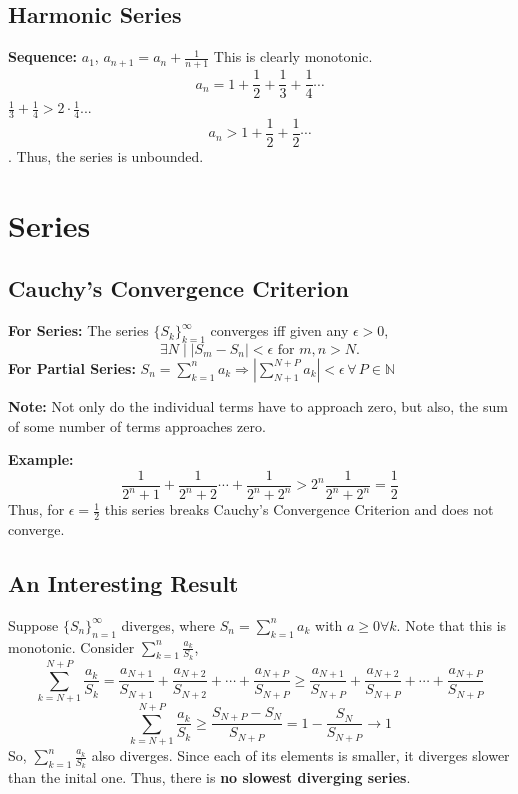 \documentclass[../main.tex]{subfiles}
\begin{document}
    \subsection{Harmonic Series}
        \textbf{Sequence: } $a_{1}$, $a_{n+1}=a_{n}+\frac{1}{n+1}$
        This is clearly monotonic.
        $$a_{n}=1+\frac{1}{2}+\frac{1}{3}+\frac{1}{4}\cdots$$
        $\frac{1}{3}+\frac{1}{4} > 2\cdot \frac{1}{4}$...
        $$a_{n}>1+\frac{1}{2}+\frac{1}{2}\cdots$$.
        Thus, the series is unbounded.

\section{Series}
    \subsection{Cauchy's Convergence Criterion}
        \textbf{For Series: } The series $\{S_{k}\}_{k=1}^{\infty}$ converges iff given any $\epsilon>0$,
        $$\exists N \mid |S_{m}-S_{n}|<\epsilon \text{ for } m, n > N\text{.}$$
        \noindent\textbf{For Partial Series: } $S_{n}=\sum_{k=1}^{n}a_{k}\Rightarrow|\sum_{N+1}^{N+P}a_{k}|<\epsilon \,\forall\, P \in \mathbb{N}$

        \noindent\textbf{Note: } Not only do the individual terms have to approach zero, but also, the sum of some number of terms approaches zero.
        
        \textbf{Example: }
            $$\frac{1}{2^{n}+1}+\frac{1}{2^{n}+2}\cdots+\frac{1}{2^{n}+2^{n}} > 2^{n}\frac{1}{2^{n}+2^{n}}=\frac{1}{2}$$
            Thus, for $\epsilon = \frac{1}{2}$ this series breaks Cauchy's Convergence Criterion and does not converge.

    \subsection{An Interesting Result}
        Suppose $\{S_{n}\}_{n=1}^{\infty}$ diverges, where $S_{n}=\sum_{k=1}^{n}a_{k}$ with $ a\geq 0 \forall k$. Note that this is monotonic.
        Consider $\sum^{n}_{k=1}\frac{a_{k}}{S_{k}}$,
            $$\sum_{k=N+1}^{N+P}\frac{a_{k}}{S_{k}}=\frac{a_{N+1}}{S_{N+1}}+\frac{a_{N+2}}{S_{N+2}}+\cdots+\frac{a_{N+P}}{S_{N+P}} \geq \frac{a_{N+1}}{S_{N+P}}+\frac{a_{N+2}}{S_{N+P}}+\cdots+\frac{a_{N+P}}{S_{N+P}}$$
            $$\sum_{k=N+1}^{N+P}\frac{a_{k}}{S_{k}}\geq\frac{S_{N+P}-S_{N}}{S_{N+P}}=1-\frac{S_{N}}{S_{N+P}}\rightarrow1$$
        So, $\sum^{n}_{k=1}\frac{a_{k}}{S_{k}}$ also diverges. Since each of its elements is smaller, it diverges slower than the inital one. Thus, there is \textbf{no slowest diverging series}.
    
\end{document}
